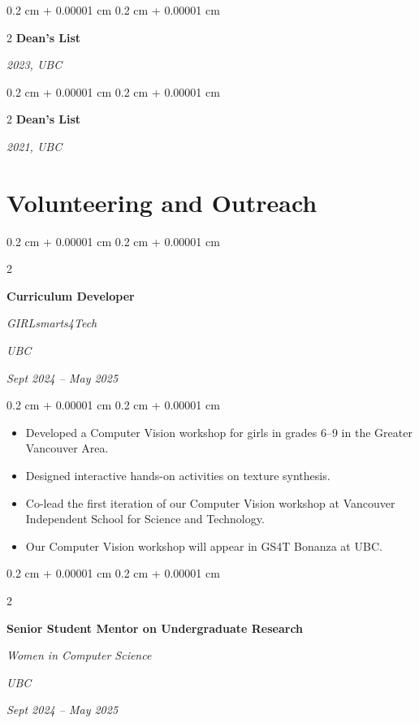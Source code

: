 \documentclass[10pt, letterpaper]{article}
\newenvironment{highlights}{
    \begin{itemize}[
        topsep=0.10 cm,
        parsep=0.10 cm,
        partopsep=0pt,
        itemsep=0pt,
        leftmargin=0.4 cm + 10pt
    ]
}{
    \end{itemize}
} %
\newenvironment{onecolentry}{
    \begin{adjustwidth}{
        0.2 cm + 0.00001 cm
    }{
        0.2 cm + 0.00001 cm
    }
}{
    \end{adjustwidth}
} %
\newenvironment{twocolentry}[2][]{
    \onecolentry
    \def\secondColumn{#2}
    \setcolumnwidth{\fill, 4.5 cm}
    \begin{paracol}{2}
}{
    \switchcolumn \raggedleft \secondColumn
    \end{paracol}
    \endonecolentry
} %
\begin{document}
        \begin{twocolentry}
            {%
            \textit{2023, UBC} %
            }{%
            \textbf{Dean's List}  %
            }
        \end{twocolentry}


        \vspace{0.2 cm}

        \begin{twocolentry}
            {%
            \textit{2021, UBC} %
            }{%
            \textbf{Dean's List}  %
            }
        \end{twocolentry}



    
    \section{Volunteering and Outreach}



        
        \begin{twocolentry}{
        \textit{UBC}    
            
        \textit{Sept 2024 – May 2025}}
            \textbf{Curriculum Developer}
            
            \textit{GIRLsmarts4Tech}
        \end{twocolentry}

        \vspace{0.10 cm}
        \begin{onecolentry}
            \begin{highlights}
                \item Developed a Computer Vision workshop for girls in grades 6--9 in the Greater Vancouver Area.
                \item Designed interactive hands-on activities on texture synthesis.
                \item Co-lead the first iteration of our Computer Vision workshop at Vancouver Independent School for Science and Technology.
                \item Our Computer Vision workshop will appear in GS4T Bonanza at UBC.
            \end{highlights}
        \end{onecolentry}


        \vspace{0.2 cm}

        \begin{twocolentry}{
        \textit{UBC}    
            
        \textit{Sept 2024 – May 2025}}
            \textbf{Senior Student Mentor on Undergraduate Research}
            
            \textit{Women in Computer Science}
        \end{twocolentry}
\end{document}
